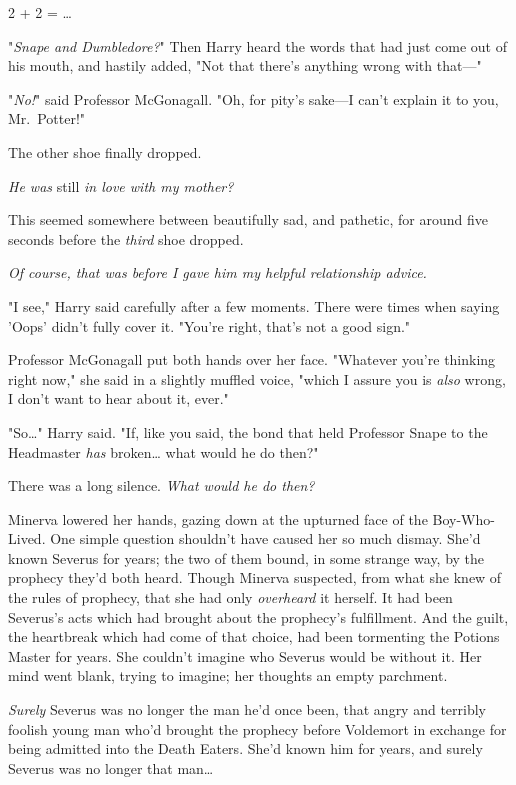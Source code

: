 2 + 2 = {\ldots}

"\emph{Snape and Dumbledore?}" Then Harry heard the words that had just come 
out of his mouth, and hastily added, "Not that there's anything wrong with 
that---"

"\emph{No!}" said Professor McGonagall. "Oh, for pity's sake---I can't explain 
it to you, Mr.~Potter!"

The other shoe finally dropped.

\emph{He was} still\emph{ in love with my mother?}

This seemed somewhere between beautifully sad, and pathetic, for around five 
seconds before the \emph{third} shoe dropped.

\emph{Of course, that was before I gave him my helpful relationship advice.}

"I see," Harry said carefully after a few moments. There were times when saying 
'Oops' didn't fully cover it. "You're right, that's not a good sign."

Professor McGonagall put both hands over her face. "Whatever you're thinking 
right now," she said in a slightly muffled voice, "which I assure you is 
\emph{also} wrong, I don't want to hear about it, ever."

"So{\ldots}" Harry said. "If, like you said, the bond that held Professor Snape 
to the Headmaster \emph{has} broken{\ldots} what would he do then?"

There was a long silence.
\sbreak
\emph{What would he do then?}

Minerva lowered her hands, gazing down at the upturned face of the 
Boy-Who-Lived. One simple question shouldn't have caused her so much dismay. 
She'd known Severus for years; the two of them bound, in some strange way, by 
the prophecy they'd both heard. Though Minerva suspected, from what she knew of 
the rules of prophecy, that she had only \emph{overheard} it herself. It had 
been Severus's acts which had brought about the prophecy's fulfillment. And the 
guilt, the heartbreak which had come of that choice, had been tormenting the 
Potions Master for years. She couldn't imagine who Severus would be without it. 
Her mind went blank, trying to imagine; her thoughts an empty parchment.

\emph{Surely} Severus was no longer the man he'd once been, that angry and 
terribly foolish young man who'd brought the prophecy before Voldemort in 
exchange for being admitted into the Death Eaters. She'd known him for years, 
and surely Severus was no longer that man{\ldots}

